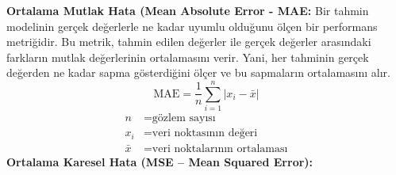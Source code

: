 \documentclass[12pt, a4paper]{article}
\begin{document}
	
	
	
	
	\textbf{Ortalama Mutlak Hata (Mean Absolute Error - MAE:} Bir tahmin modelinin gerçek değerlerle ne kadar uyumlu olduğunu ölçen bir performans metriğidir. Bu metrik, tahmin edilen değerler ile gerçek değerler arasındaki farkların mutlak değerlerinin ortalamasını verir. Yani, her tahminin gerçek değerden ne kadar sapma gösterdiğini ölçer ve bu sapmaların ortalamasını alır.
	\[
	\text{MAE} = \frac{1}{n} \sum_{i=1}^{n} \left| x_i - \bar{x} \right|
	\]
	\begin{align*}
		n &= \text{gözlem sayısı} \\
		x_i &= \text{veri noktasının değeri} \\
		\bar{x} &= \text{veri noktalarının ortalaması}
	\end{align*}
	\newpage \textbf{Ortalama Karesel Hata (MSE – Mean Squared Error):}
	
\end{document}
